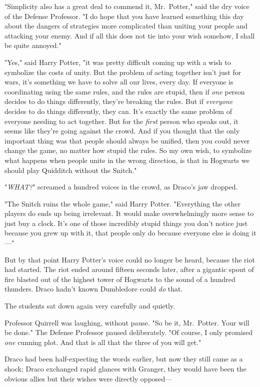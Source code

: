 "Simplicity also has a great deal to commend it, Mr.~Potter," said the dry
voice of the Defense Professor. "I do hope that you have learned something this
day about the dangers of strategies more complicated than uniting your people
and attacking your enemy. And if all this does not tie into your wish somehow,
I shall be quite annoyed."

"Yes," said Harry Potter, "it was pretty difficult coming up with a wish to
symbolize the costs of unity. But the problem of acting together isn't just for
wars, it's something we have to solve all our lives, every day. If everyone is
coordinating using the same rules, and the rules are stupid, then if \emph{one}
person decides to do things differently, they're breaking the rules. But if
\emph{everyone} decides to do things differently, they can. It's exactly the
same problem of everyone needing to act together. But for the \emph{first}
person who speaks out, it seems like they're going against the crowd. And if
you thought that the only important thing was that people should always be
unified, then you could never change the game, no matter how stupid the rules.
So my own wish, to symbolize what happens when people unite in the wrong
direction, is that in Hogwarts we should play Quidditch without the Snitch."

"\emph{WHAT?}" screamed a hundred voices in the crowd, as Draco's jaw dropped.

"The Snitch ruins the whole game," said Harry Potter. "Everything the other
players do ends up being irrelevant. It would make overwhelmingly more sense to
just buy a clock. It's one of those incredibly stupid things you don't notice
just because you grew up with it, that people only do because everyone else is
doing it\mbox{---}"

But by that point Harry Potter's voice could no longer be heard, because the
riot had started.
\sbreak
The riot ended around fifteen seconds later, after a gigantic spout of fire
blasted out of the highest tower of Hogwarts to the sound of a hundred
thunders. Draco hadn't known Dumbledore could \emph{do} that.

The students sat down again very carefully and quietly.

Professor Quirrell was laughing, without pause. "So be it, Mr.~Potter. Your
will be done." The Defense Professor paused deliberately. "Of course, I only
promised \emph{one} cunning plot. And that is all that the three of you will
get."

Draco had been half-expecting the words earlier, but now they still came as a
shock; Draco exchanged rapid glances with Granger, they would have been the
obvious allies but their wishes were directly opposed---

